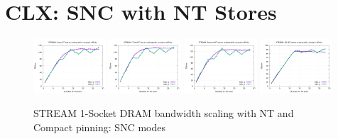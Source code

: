 \documentclass{article}
\begin{document}
\section{CLX: SNC with NT Stores}
\begin{figure}[!ht]
    \centering
    \includegraphics[width=0.24\textwidth]{../data/clx-8280l-snc/mem_bw_scale/mb_scale_compact_Copy_nt}
    \includegraphics[width=0.24\textwidth]{../data/clx-8280l-snc/mem_bw_scale/mb_scale_compact_Triad_nt}
    \includegraphics[width=0.24\textwidth]{../data/clx-8280l-snc/mem_bw_scale/mb_scale_compact_Reduce_nt}
    \includegraphics[width=0.24\textwidth]{../data/clx-8280l-snc/mem_bw_scale/mb_scale_compact_Fill_nt}
    \caption{STREAM 1-Socket DRAM bandwidth scaling with NT and Compact pinning: SNC modes}
    \label{figure:mem_bw_scale_compact_NT_clx_snc}
\end{figure}
\end{document}
